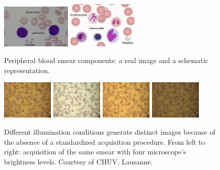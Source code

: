 \begin{figure}[h]
	\centering
	\includegraphics[width=0.3\textwidth]{images/Cells1}
	\includegraphics[width=0.3\textwidth]{images/Cells2}
	\caption[Peripheral blood smear components.]{\label{fig:leukocytes2} Peripheral blood smear components: a real image and a schematic representation.}
\end{figure}

\begin{figure}[h]
	\centering    
	\includegraphics[width=0.22\textwidth]{images/malaria/f1a}
	\includegraphics[width=0.22\textwidth]{images/malaria/f1b}
	\includegraphics[width=0.22\textwidth]{images/malaria/f1c}
	\includegraphics[width=0.22\textwidth]{images/malaria/f1d}
	\caption[Example of different illumination conditions.]{\label{fig:images_types} Different illumination conditions generate distinct images because of the absence of a standardized acquisition procedure. From left to right: acquisition of the same smear with four microscope's brightness levels. Courtesy of CHUV, Lausanne.}
\end{figure}

